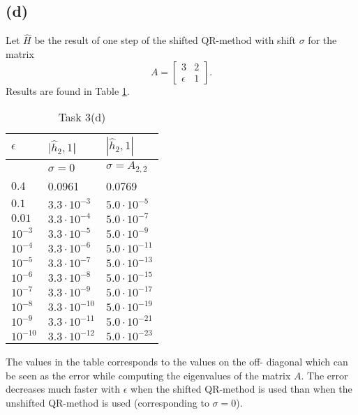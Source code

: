 \subsection*{(d)}
Let $\hat{H}$ be the result of one step of the shifted QR-method with shift $\sigma$ for the matrix
\begin{equation}
A =
\begin{bmatrix}
3 & 2\\ \epsilon & 1
\end{bmatrix}.
\end{equation}
Results are found in Table \ref{task3d}.

\begin{table}[h!]
	\centering
	\caption{Task 3(d)}
	\label{task3d}
	\begin{tabular}{l | l | l }
	$\epsilon$	& $|\hat{h}_2,1$| & $|\hat{h}_2,1|$\\ \hline
	& $\sigma = 0$ & $\sigma = A_{2,2}$\\ \hline \hline
		$0.4$ & 0.0961 & 0.0769 \\ \hline
		$0.1$ & $3.3\cdot 10^{-3}$ & $ 5.0\cdot 10^{-5}$\\  \hline
		$0.01$ & $3.3\cdot 10^{-4}$ & $ 5.0\cdot 10^{-7}$\\  \hline
		$10^{-3}$ & $3.3\cdot 10^{-5}$ &$ 5.0\cdot 10^{-9}$\\  \hline
		$10^{-4}$ & $3.3\cdot 10^{-6}$ & $ 5.0\cdot 10^{-11}$\\  \hline
		$10^{-5}$ & $3.3\cdot 10^{-7}$ & $ 5.0\cdot 10^{-13}$\\  \hline
		$10^{-6}$ & $3.3\cdot 10^{-8}$ & $ 5.0\cdot 10^{-15}$\\  \hline
		$10^{-7}$ & $3.3\cdot 10^{-9}$ & $ 5.0\cdot 10^{-17}$\\  \hline
		$10^{-8}$ & $3.3\cdot 10^{-10}$ & $ 5.0\cdot 10^{-19}$\\  \hline
		$10^{-9}$ & $3.3\cdot 10^{-11}$ & $ 5.0\cdot 10^{-21}$\\  \hline
		$10^{-10}$ & $3.3\cdot 10^{-12}$ & $ 5.0\cdot 10^{-23}$\\  \hline
	\end{tabular}
\end{table}
The values in the table corresponds to the values on the off- diagonal which can be seen as the error while computing the eigenvalues of the matrix $A$. The error decreases much faster with $\epsilon$ when the shifted QR-method is used than when the unshifted QR-method is used (corresponding to $\sigma = 0$).
